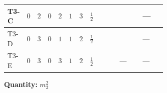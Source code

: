 \documentclass[8pt]{article}
\begin{document}
\begin{landscape}
\begin{longtable}{@{}llcccccc >{\raggedright\arraybackslash}p{0.21\linewidth} >{\raggedright\arraybackslash}p{0.21\linewidth} >{\raggedright\arraybackslash}p{0.21\linewidth}@{}}
\midrule
T3-C & $0$ & $2$ & $0$ & $2$ & $1$ & $3$ & $\frac{1}{2}$ & \scriptsize\adjustbox{max width=\linewidth}{$\begin{gathered} -6 {g_1}^2 {m_2^2}\end{gathered}$} & \scriptsize\adjustbox{max width=\linewidth}{$\begin{gathered} +4 {\lambda_{12}^{(1)}} {m_1^2}\end{gathered}$} & --- \\
\midrule
T3-D & $0$ & $3$ & $0$ & $1$ & $1$ & $2$ & $\frac{1}{2}$ & \scriptsize\adjustbox{max width=\linewidth}{$\begin{gathered} -6 {g_1}^2 {m_2^2}\end{gathered}$} & \scriptsize\adjustbox{max width=\linewidth}{$\begin{gathered} +6 {\lambda_{12}^{(1)}} {m_1^2}\end{gathered}$} & --- \\
\midrule
T3-E & $0$ & $3$ & $0$ & $3$ & $1$ & $2$ & $\frac{1}{2}$ & \scriptsize\adjustbox{max width=\linewidth}{$\begin{gathered} -6 {g_1}^2 {m_2^2}\end{gathered}$} & --- & --- \\
\midrule
\bottomrule
\end{longtable}
\clearpage
\noindent\textbf{Quantity: }$m_2^2$\par\smallskip

\end{landscape}
\end{document}
